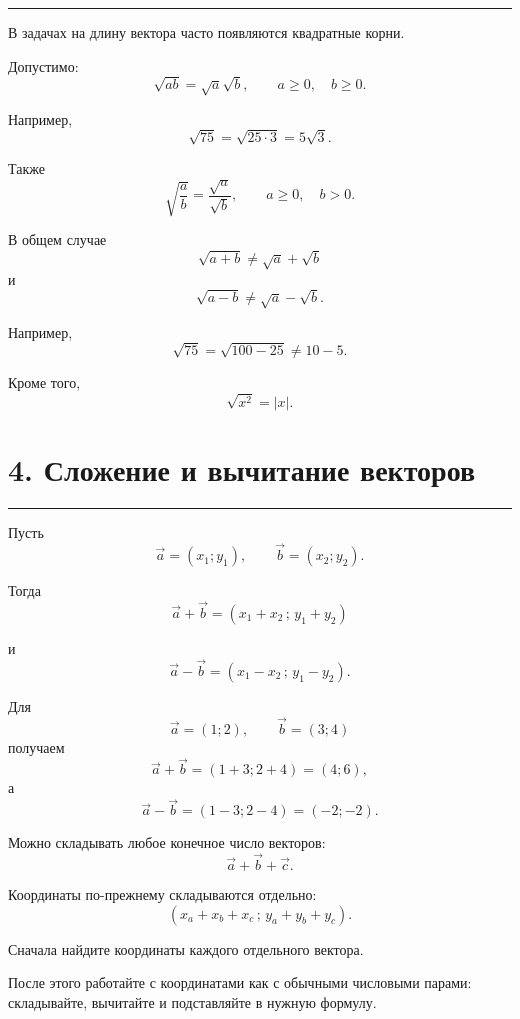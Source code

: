 \documentclass[a4paper,12pt]{article}
\newcommand{\sectionline}{%
    \par\noindent
    {\color{accent}\rule{\linewidth}{0.6pt}}
    \par
}
\begin{document}
\sectionline

В задачах на длину вектора часто появляются квадратные корни.

Допустимо:
\[
\sqrt{ab}=\sqrt a\sqrt b,
\qquad a\ge0,\quad b\ge0.
\]

Например,
\[
\sqrt{75}
=
\sqrt{25\cdot3}
=
5\sqrt3.
\]

Также
\[
\sqrt{\frac ab}
=
\frac{\sqrt a}{\sqrt b},
\qquad
a\ge0,\quad b>0.
\]

\begin{warningbox}
В общем случае
\[
\boxed{
\sqrt{a+b}\ne\sqrt a+\sqrt b
}
\]
и
\[
\boxed{
\sqrt{a-b}\ne\sqrt a-\sqrt b.
}
\]

Например,
\[
\sqrt{75}
=
\sqrt{100-25}
\ne
10-5.
\]

Кроме того,
\[
\boxed{\sqrt{x^2}=|x|.}
\]
\end{warningbox}


\section*{\color{darkaccent}4. Сложение и вычитание векторов}

\sectionline

Пусть
\[
\vec a=(x_1;y_1),
\qquad
\vec b=(x_2;y_2).
\]

Тогда
\[
\boxed{
\vec a+\vec b=
(x_1+x_2\,;\,y_1+y_2)
}
\]

и
\[
\boxed{
\vec a-\vec b=
(x_1-x_2\,;\,y_1-y_2).
}
\]

\begin{examplebox}[Пример]
Для
\[
\vec a=(1;2),
\qquad
\vec b=(3;4)
\]
получаем
\[
\vec a+\vec b
=
(1+3;2+4)
=
(4;6),
\]
а
\[
\vec a-\vec b
=
(1-3;2-4)
=
(-2;-2).
\]
\end{examplebox}

Можно складывать любое конечное число векторов:
\[
\vec a+\vec b+\vec c.
\]

Координаты по-прежнему складываются отдельно:
\[
(x_a+x_b+x_c\,;\,y_a+y_b+y_c).
\]

\begin{keybox}[Стратегия]
Сначала найдите координаты каждого отдельного вектора.

После этого работайте с координатами как с обычными числовыми парами:
складывайте, вычитайте и подставляйте в нужную формулу.
\end{keybox}

\end{document}
